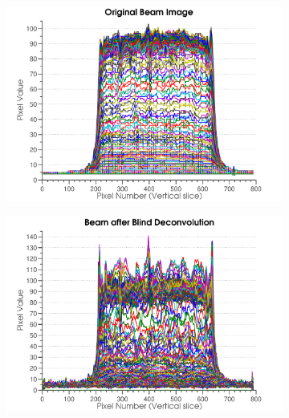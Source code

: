 \begin{figure}
        \centering
        \begin{subfigure}[b]{0.45\textwidth}
                \centering
                \includegraphics[width=\textwidth]{figures/beam/fig_beam_orig.pdf}
                \caption{}
                \label{figallbeams1}
        \end{subfigure}
				\qquad
        \begin{subfigure}[b]{0.45\textwidth}
                \centering
                \includegraphics[width=\textwidth]{figures/beam/fig_beam_blind.pdf}
                \caption{}
                \label{figallbeams2}
        \end{subfigure}
				\\
				\begin{subfigure}[b]{0.45\textwidth}

\end{subfigure}
\end{figure}
